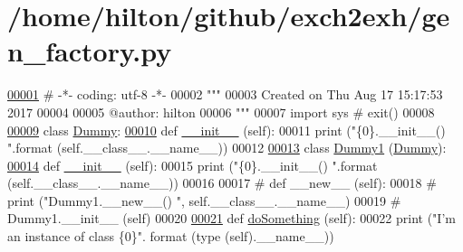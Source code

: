 \hypertarget{gen__factory_8py_source}{}\section{/home/hilton/github/exch2exh/gen\+\_\+factory.py}

\begin{DoxyCode}
\hypertarget{gen__factory_8py_source.tex_l00001}{}\hyperlink{namespacegen__factory}{00001} \textcolor{comment}{# -*- coding: utf-8 -*-}
00002 \textcolor{stringliteral}{"""}
00003 \textcolor{stringliteral}{Created on Thu Aug 17 15:17:53 2017}
00004 \textcolor{stringliteral}{}
00005 \textcolor{stringliteral}{@author: hilton}
00006 \textcolor{stringliteral}{"""}
00007 \textcolor{keyword}{import} sys \textcolor{comment}{# exit()}
00008 
\hypertarget{gen__factory_8py_source.tex_l00009}{}\hyperlink{classgen__factory_1_1_dummy}{00009} \textcolor{keyword}{class }\hyperlink{classgen__factory_1_1_dummy}{Dummy}: 
\hypertarget{gen__factory_8py_source.tex_l00010}{}\hyperlink{classgen__factory_1_1_dummy_aed8c66d829aedd98a5b1bed80725ffab}{00010}     \textcolor{keyword}{def }\hyperlink{classgen__factory_1_1_dummy_aed8c66d829aedd98a5b1bed80725ffab}{\_\_init\_\_} (self):
00011         \textcolor{keywordflow}{print} (\textcolor{stringliteral}{"\{0\}.\_\_init\_\_() "}.format (self.\_\_class\_\_.\_\_name\_\_))
00012 
\hypertarget{gen__factory_8py_source.tex_l00013}{}\hyperlink{classgen__factory_1_1_dummy1}{00013} \textcolor{keyword}{class }\hyperlink{classgen__factory_1_1_dummy1}{Dummy1} (\hyperlink{classgen__factory_1_1_dummy}{Dummy}):
\hypertarget{gen__factory_8py_source.tex_l00014}{}\hyperlink{classgen__factory_1_1_dummy1_a9bb75256a466ee77a0ae2cafb339fe62}{00014}     \textcolor{keyword}{def }\hyperlink{classgen__factory_1_1_dummy1_a9bb75256a466ee77a0ae2cafb339fe62}{\_\_init\_\_} (self):
00015         \textcolor{keywordflow}{print} (\textcolor{stringliteral}{"\{0\}.\_\_init\_\_() "}.format (self.\_\_class\_\_.\_\_name\_\_))
00016         
00017 \textcolor{comment}{#    def \_\_new\_\_ (self):}
00018 \textcolor{comment}{#        print ("Dummy1.\_\_new\_\_() ", self.\_\_class\_\_.\_\_name\_\_)}
00019 \textcolor{comment}{#        Dummy1.\_\_init\_\_ (self)}
00020         
\hypertarget{gen__factory_8py_source.tex_l00021}{}\hyperlink{classgen__factory_1_1_dummy1_af8a40601dbd998624323da24581dfa1c}{00021}     \textcolor{keyword}{def }\hyperlink{classgen__factory_1_1_dummy1_af8a40601dbd998624323da24581dfa1c}{doSomething} (self):
00022         \textcolor{keywordflow}{print} (\textcolor{stringliteral}{"I'm an instance of class \{0\}"}. format (type (self).\_\_name\_\_))

\end{DoxyCode}
